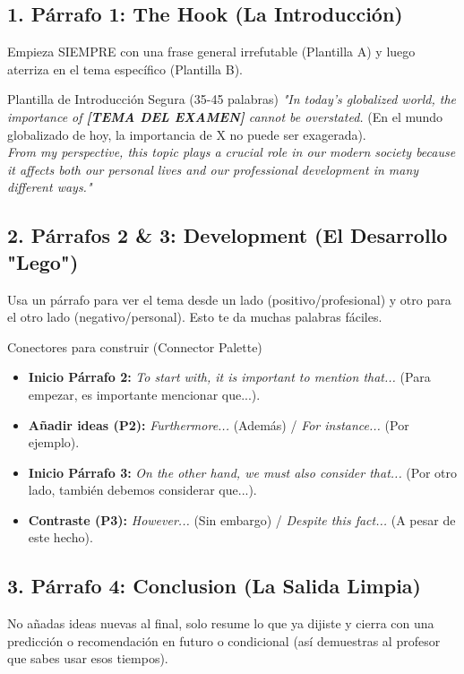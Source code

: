 \documentclass[11pt,a4paper]{article}
\begin{document}
\subsection{1. Párrafo 1: The Hook (La Introducción)}
Empieza SIEMPRE con una frase general irrefutable (Plantilla A) y luego aterriza en el tema específico (Plantilla B).

\begin{hackbox}{Plantilla de Introducción Segura (35-45 palabras)}
    \textit{"In today's globalized world, the importance of \textbf{[TEMA DEL EXAMEN]} cannot be overstated.} (En el mundo globalizado de hoy, la importancia de X no puede ser exagerada). \\
    \textit{From my perspective, this topic plays a crucial role in our modern society because it affects both our personal lives and our professional development in many different ways."}
\end{hackbox}

\subsection{2. Párrafos 2 \& 3: Development (El Desarrollo "Lego")}
Usa un párrafo para ver el tema desde un lado (positivo/profesional) y otro para el otro lado (negativo/personal). Esto te da muchas palabras fáciles.

\begin{hackbox}{Conectores para construir (Connector Palette)}
    \begin{itemize}[noitemsep]
        \item \textbf{Inicio Párrafo 2:} \textit{To start with, it is important to mention that...} (Para empezar, es importante mencionar que...).
        \item \textbf{Añadir ideas (P2):} \textit{Furthermore...} (Además) / \textit{For instance...} (Por ejemplo).
        \item \textbf{Inicio Párrafo 3:} \textit{On the other hand, we must also consider that...} (Por otro lado, también debemos considerar que...).
        \item \textbf{Contraste (P3):} \textit{However...} (Sin embargo) / \textit{Despite this fact...} (A pesar de este hecho).
    \end{itemize}
\end{hackbox}

\subsection{3. Párrafo 4: Conclusion (La Salida Limpia)}
No añadas ideas nuevas al final, solo resume lo que ya dijiste y cierra con una predicción o recomendación en futuro o condicional (así demuestras al profesor que sabes usar esos tiempos).
\end{document}
